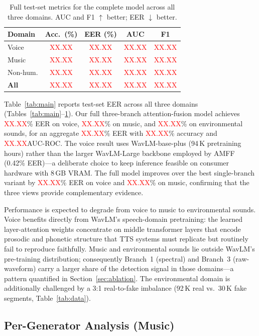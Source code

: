 \documentclass[10pt,twocolumn,a4paper]{article}
\newcommand{\NUM}{\textcolor{red}{XX.XX}}
\begin{document}
\begin{table}[t]
\centering
\caption{Full test-set metrics for the complete model across all three domains. AUC and F1 $\uparrow$ better; EER $\downarrow$ better.}
\label{tab:full_metrics}
\small
\begin{tabular}{@{}lcccc@{}}
\toprule
\textbf{Domain} & \textbf{Acc.\ (\%)} & \textbf{EER (\%)} & \textbf{AUC} & \textbf{F1} \\
\midrule
Voice    & \NUM & \NUM & \NUM & \NUM \\
Music    & \NUM & \NUM & \NUM & \NUM \\
Non-hum. & \NUM & \NUM & \NUM & \NUM \\
\midrule
\textbf{All} & \NUM & \NUM & \NUM & \NUM \\
\bottomrule
\end{tabular}
\end{table}

Table~\ref{tab:main} reports test-set EER across all three domains (Tables~\ref{tab:main}--\ref{tab:full_metrics}). Our full three-branch attention-fusion model achieves \NUM\% EER on voice, \NUM\% on music, and \NUM\% on environmental sounds, for an aggregate \NUM\% EER with \NUM\% accuracy and \NUM AUC-ROC. The voice result uses WavLM-base-plus (94\,K pretraining hours) rather than the larger WavLM-Large backbone employed by AMFF~\cite{amff_nexttdnn_2025} (0.42\% EER)---a deliberate choice to keep inference feasible on consumer hardware with 8\,GB VRAM. The full model improves over the best single-branch variant by \NUM\% EER on voice and \NUM\% on music, confirming that the three views provide complementary evidence.

Performance is expected to degrade from voice to music to environmental sounds. Voice benefits directly from WavLM's speech-domain pretraining: the learned layer-attention weights concentrate on middle transformer layers that encode prosodic and phonetic structure that TTS systems must replicate but routinely fail to reproduce faithfully. Music and environmental sounds lie outside WavLM's pre-training distribution; consequently Branch~1 (spectral) and Branch~3 (raw-waveform) carry a larger share of the detection signal in those domains---a pattern quantified in Section~\ref{sec:ablation}. The environmental domain is additionally challenged by a 3:1 real-to-fake imbalance (92\,K real vs.\ 30\,K fake segments, Table~\ref{tab:data}).

\subsection{Per-Generator Analysis (Music)}
\end{document}
